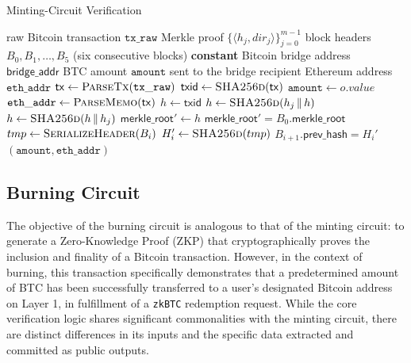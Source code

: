 \documentclass{DESSThesis}
\newcommand{\zktoken}{\texttt{zkBTC}}
\begin{document}
\begin{algorithm} 
  \caption{Minting-Circuit Verification}
  \label{alg:minting_circuit}
  \begin{algorithmic}[1]  %
    \Require raw Bitcoin transaction $\mathtt{tx\_raw}$
    \Require Merkle proof $\bigl\{\langle h_j,\textit{dir}_j\rangle\bigr\}_{j=0}^{m-1}$
    \Require block headers $B_0,B_1,\dots,B_5$ (six consecutive blocks)
    \Statex
    \State \textbf{constant} Bitcoin bridge address $\mathsf{bridge\_addr}$
    \Statex
    \Ensure BTC amount $\mathtt{amount}$ sent to the bridge
    \Ensure recipient Ethereum address $\mathtt{eth\_addr}$
    \Statex
    \State $\mathsf{tx} \gets \Call{ParseTx}{\mathtt{tx\_raw}}$
    \State $\mathsf{txid} \gets \Call{SHA256d}{\mathsf{tx}}$
        \State $\mathtt{amount} \gets o.\textit{value}$
      \EndIf
    \EndFor
    \State $\mathtt{eth\_addr} \gets \Call{ParseMemo}{\mathsf{tx}}$ 
    \Statex
    \State $h \gets \mathsf{txid}$  
        \State $h \gets \Call{SHA256d}{h_j \,\|\, h}$
      \Else
        \State $h \gets \Call{SHA256d}{h \,\|\, h_j}$
      \EndIf
    \EndFor
    \State $\mathsf{merkle\_root}' \gets h$
    \Assert $\mathsf{merkle\_root}' = B_0.\mathsf{merkle\_root}$
    \Statex
        \State $tmp \gets \Call{SerializeHeader}{B_i}$
        \State $H_i' \gets \Call{SHA256d}{tmp}$
        \Assert $B_{i+1}.\mathsf{prev\_hash} = H_i'$
    \EndFor
    \Statex
    \Return $(\mathtt{amount},\mathtt{eth\_addr})$
  \end{algorithmic}
\end{algorithm}


\subsection{Burning Circuit}
The objective of the burning circuit is analogous to that of the minting circuit: to generate a Zero-Knowledge Proof (ZKP) that cryptographically proves the inclusion and finality of a Bitcoin transaction. However, in the context of burning, this transaction specifically demonstrates that a predetermined amount of BTC has been successfully transferred to a user's designated Bitcoin address on Layer 1, in fulfillment of a \texttt{\zktoken} redemption request. While the core verification logic shares significant commonalities with the minting circuit, there are distinct differences in its inputs and the specific data extracted and committed as public outputs.
\end{document}
